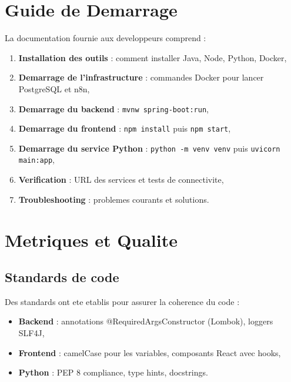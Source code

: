 \section{Guide de Demarrage}

La documentation fournie aux developpeurs comprend :

\begin{enumerate}
    \item \textbf{Installation des outils} : comment installer Java, Node, Python, Docker,
    
    \item \textbf{Demarrage de l'infrastructure} : commandes Docker pour lancer PostgreSQL et n8n,
    
    \item \textbf{Demarrage du backend} : \texttt{mvnw spring-boot:run},
    
    \item \textbf{Demarrage du frontend} : \texttt{npm install} puis \texttt{npm start},
    
    \item \textbf{Demarrage du service Python} : \texttt{python -m venv venv} puis \texttt{uvicorn main:app},
    
    \item \textbf{Verification} : URL des services et tests de connectivite,
    
    \item \textbf{Troubleshooting} : problemes courants et solutions.
\end{enumerate}

\section{Metriques et Qualite}

\subsection{Standards de code}

Des standards ont ete etablis pour assurer la coherence du code :

\begin{itemize}
    \item \textbf{Backend} : annotations @RequiredArgsConstructor (Lombok), loggers SLF4J,
    
    \item \textbf{Frontend} : camelCase pour les variables, composants React avec hooks,
    
    \item \textbf{Python} : PEP 8 compliance, type hints, docstrings.
\end{itemize}

